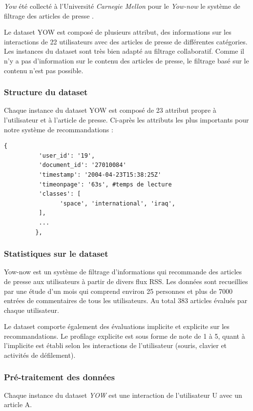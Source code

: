         \emph{Yow} été collecté à l'Université \emph{Carnegie Mellon} pour le \emph{Yow-now} le système de filtrage des articles de presse \cite{carnegieYOW}.

        Le dataset YOW est composé de plusieurs attribut, des informations sur les interactions de 22 utilisateurs avec des articles de presse de différentes catégories. Les instances du dataset sont très bien adapté au filtrage collaboratif. Comme il n'y a pas d'information sur le contenu des articles de presse, le filtrage basé sur le contenu n'est pas possible. 

        \subsubsection{Structure du dataset}
        Chaque instance du dataset YOW est composé de 23 attribut propre à l'utilisateur et à l'article de presse. Ci-après les attributs les plus importants pour notre système de recommandations :  
        \begin{lstlisting}[style=code] 
         {
          'user_id': '19', 
          'document_id': '27010084'
          'timestamp': '2004-04-23T15:38:25Z'
          'timeonpage': '63s', #temps de lecture
          'classes': [
                'space', 'international', 'iraq', 
          ],
          ...
         },
        \end{lstlisting}

        \subsubsection{Statistiques sur le dataset}
        Yow-now est un système de filtrage d'informations qui recommande des articles de presse aux utilisateurs à partir de divers flux RSS. Les données sont recueillies par une étude d'un mois qui comprend environ 25 personnes et plus de 7000 entrées de commentaires de tous les utilisateurs. Au total 383 articles évalués par chaque utilisateur. 

        Le dataset comporte également des évaluations implicite et explicite sur les recommandations. Le profilage explicite est sous forme de note de 1 à 5, quant à l'implicite est établi selon les interactions de l'utilisateur (souris, clavier et activités de défilement).
        

        \subsubsection{Pré-traitement des données}
        Chaque instance du dataset \emph{YOW} est une interaction de l'utilisateur U avec un article A.


